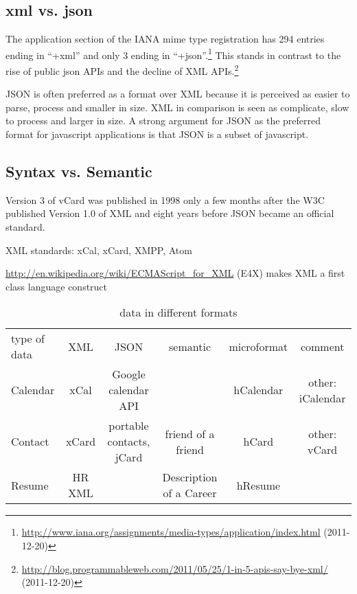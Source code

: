 \documentclass[12pt,a4paper]{scrartcl}		%
\newcommand{\citeurl}[2]{\url{#1} (#2)}
\begin{document}
\subsection{xml vs. json}

The application section of the IANA mime type registration has 294 entries
ending in ``+xml'' and only 3 ending in
``+json''.\footnote{\citeurl{http://www.iana.org/assignments/media-types/application/index.html}{2011-12-20}}
This stands in contrast to the rise of public json APIs and the decline of XML
APIs.\footnote{\citeurl{http://blog.programmableweb.com/2011/05/25/1-in-5-apis-say-bye-xml/}{2011-12-20}}

JSON is often preferred as a format over XML because it is perceived as easier
to parse, process and smaller in size. XML in comparison is seen as complicate,
slow to process and larger in size. A strong argument for JSON as the preferred
format for javascript applications is that JSON is a subset of javascript.


\subsection{Syntax vs. Semantic}

Version 3 of vCard was published in 1998\cite{RFC2425} only a few months after
the W3C published Version 1.0 of XML\cite{Paoli:98:XR} and eight years before
JSON became an official standard.\cite{RFC4627}

XML standards:
  xCal, xCard, XMPP, Atom

\url{http://en.wikipedia.org/wiki/ECMAScript_for_XML} (E4X) makes XML a first class language construct 

\begin{table}
  \begin{tabular}{l c c c c c}
    type of data & XML  & JSON                      & semantic          & microformat & comment \\
    Calendar     & xCal & Google calendar API       &                   & hCalendar & other: iCalendar  \\
    Contact      & xCard & portable contacts, jCard & friend of a friend & hCard & other: vCard \\
    Resume       & HR XML &                          & Description of a Career & hResume & \\    
  \end{tabular}
  \caption{data in different formats}
  \label{tab:data-formats}
\end{table}
\end{document}
